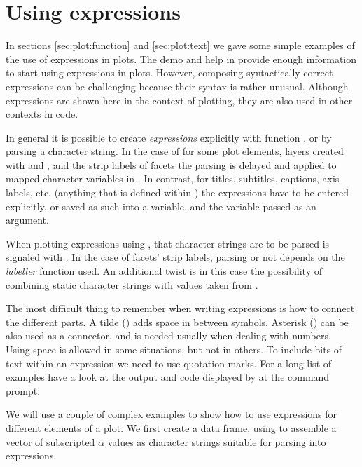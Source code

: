 \documentclass[krantz2]{krantz}\usepackage{knitr}
\begin{document}

\section[Using plotmath expressions]{Using  expressions}\label{sec:plot:plotmath}
In sections \ref{sec:plot:function} and \ref{sec:plot:text} we gave some simple examples of the use of \Rlang expressions in plots. The  demo and help in \Rlang provide enough information to start using expressions in plots. However, composing syntactically correct expressions can be challenging because their syntax is rather unusual. Although expressions are shown here in the context of plotting, they are also used in other contexts in \Rlang code.

In general it is possible to create \emph{expressions} explicitly with function , or by parsing a character string. In the case of \ggplot for some plot elements, layers created with  and , and the strip labels of facets the parsing is delayed and applied to mapped character variables in . In contrast, for titles, subtitles, captions, axis-labels, etc. (anything that is defined within ) the expressions have to be entered explicitly, or saved as such into a variable, and the variable passed as an argument.

When plotting expressions using , that character strings are to be parsed is signaled with . In the case of facets' strip labels, parsing or not depends on the \emph{labeller} function used. An additional twist is in this case the possibility of combining static character strings with values taken from .

The most difficult thing to remember when writing expressions is how to connect the different parts. A tilde (\code{\textasciitilde}) adds space in between symbols. Asterisk (\code{*}) can be also used as a connector, and is needed usually when dealing with numbers. Using space is allowed in some situations, but not in others. To include bits of text within an expression we need to use quotation marks. For a long list of examples have a look at the output and code displayed by  at the \Rlang command prompt.

We will use a couple of complex examples to show how to use expressions for different elements of a plot.
We first create a data frame, using  to assemble a vector of subscripted $\alpha$ values as character strings suitable for parsing into expressions.
\end{document}
